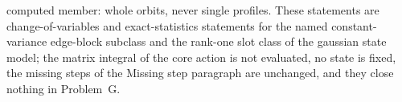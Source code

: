 computed member: whole orbits, never single profiles. These statements are change-of-variables and exact-statistics statements for the named constant-variance edge-block subclass and the rank-one slot class of the gaussian state model; the matrix integral of the core action is not evaluated, no state is fixed, the missing steps of the Missing step paragraph are unchanged, and they close nothing in Problem~G.
